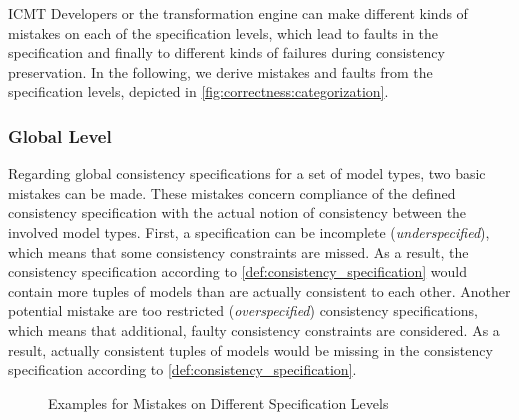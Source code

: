 \begin{copiedFrom}{ICMT}
Developers or the transformation engine can make different kinds of mistakes on each of the specification levels, which lead to faults in the specification and finally to different kinds of failures during consistency preservation.
In the following, we derive mistakes and faults from the specification levels, depicted in \autoref{fig:correctness:categorization}.

\subsubsection{Global Level}
Regarding global consistency specifications for a set of model types, two basic mistakes can be made. 
These mistakes concern compliance of the defined consistency specification with the actual notion of consistency between the involved model types.
First, a specification can be incomplete (\emph{underspecified}), which means that some consistency constraints are missed. 
As a result, the consistency specification according to \autoref{def:consistency_specification} would contain more tuples of models than are actually consistent to each other. 
Another potential mistake are too restricted (\emph{overspecified}) consistency specifications, which means that additional, faulty consistency constraints are considered. 
As a result, actually consistent tuples of models would be missing in the consistency specification according to \autoref{def:consistency_specification}. 

\begin{figure}[bt]
    \centering
    
    \caption{Examples for Mistakes on Different Specification Levels}
    \label{fig:correctness:mistakes_specification_levels}
\end{figure}


\end{copiedFrom}
